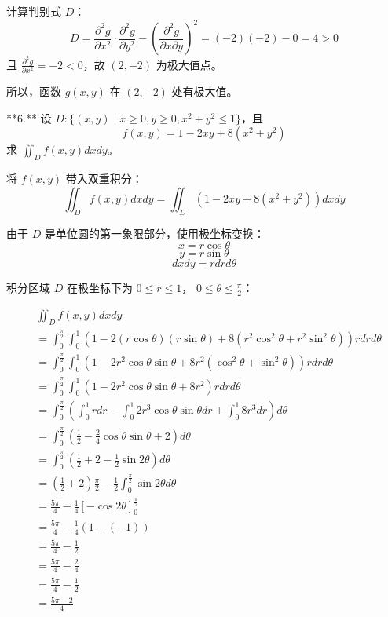 计算判别式 \(D\)：
\[ D = \frac{\partial^2 g}{\partial x^2} \cdot \frac{\partial^2 g}{\partial y^2} - \left( \frac{\partial^2 g}{\partial x \partial y} \right)^2 = (-2)(-2) - 0 = 4 > 0 \]
且 \(\frac{\partial^2 g}{\partial x^2} = -2 < 0\)，故 \((2, -2)\) 为极大值点。

所以，函数 \(g(x,

 y)\) 在 \((2, -2)\) 处有极大值。

**6.** 设 \(D: \{ (x, y) \mid x \geq 0, y \geq 0, x^2 + y^2 \leq 1 \} \)，且
\[ f(x, y) = 1 - 2xy + 8(x^2 + y^2) \]
求 \(\iint_D f(x, y) dxdy\)。

将 \(f(x, y)\) 带入双重积分：
\[ \iint_D f(x, y) dxdy = \iint_D (1 - 2xy + 8(x^2 + y^2)) dxdy \]

由于 \(D\) 是单位圆的第一象限部分，使用极坐标变换：
\[ x = r \cos \theta \]
\[ y = r \sin \theta \]
\[ dxdy = r dr d\theta \]

积分区域 \(D\) 在极坐标下为 \(0 \leq r \leq 1\)， \(0 \leq \theta \leq \frac{\pi}{2}\)：

\[
\begin{aligned}
&\iint_D f(x, y) dxdy \\
&= \int_0^{\frac{\pi}{2}} \int_0^1 \left(1 - 2(r \cos \theta)(r \sin \theta) + 8(r^2 \cos^2 \theta + r^2 \sin^2 \theta)\right) r dr d\theta \\
&= \int_0^{\frac{\pi}{2}} \int_0^1 \left(1 - 2r^2 \cos \theta \sin \theta + 8r^2 (\cos^2 \theta + \sin^2 \theta)\right) r dr d\theta \\
&= \int_0^{\frac{\pi}{2}} \int_0^1 \left(1 - 2r^2 \cos \theta \sin \theta + 8r^2\right) r dr d\theta \\
&= \int_0^{\frac{\pi}{2}} \left( \int_0^1 r dr - \int_0^1 2r^3 \cos \theta \sin \theta dr + \int_0^1 8r^3 dr \right) d\theta \\
&= \int_0^{\frac{\pi}{2}} \left( \frac{1}{2} - \frac{2}{4} \cos \theta \sin \theta + 2 \right) d\theta \\
&= \int_0^{\frac{\pi}{2}} \left( \frac{1}{2} + 2 - \frac{1}{2} \sin 2\theta \right) d\theta \\
&= \left(\frac{1}{2} + 2\right) \frac{\pi}{2} - \frac{1}{2} \int_0^{\frac{\pi}{2}} \sin 2\theta d\theta \\
&= \frac{5\pi}{4} - \frac{1}{4} \left[ -\cos 2\theta \right]_0^{\frac{\pi}{2}} \\
&= \frac{5\pi}{4} - \frac{1}{4} (1 - (-1)) \\
&= \frac{5\pi}{4} - \frac{1}{2} \\
&= \frac{5\pi}{4} - \frac{2}{4} \\
&= \frac{5\pi}{4} - \frac{1}{2} \\
&= \frac{5\pi - 2}{4}
\end{aligned}
\]

